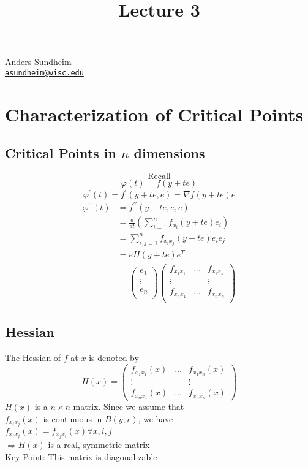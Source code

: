 \documentclass[12pt]{article}
\title{Lecture 3}
\newcommand{\doubleprime}{^{\prime\prime}}
\newcommand{\phii}{\varphi}
\begin{document}
\maketitle
\vspace*{-0.25in}
\begin{center}
	Anders Sundheim \\
	\href{mailto:asundheim@wisc.edu}{{\tt asundheim@wisc.edu}}
\end{center}
\section{Characterization of Critical Points}
\subsection{Critical Points in $n$ dimensions}
\[ \text{Recall} \]
\[ \phii(t) = f(y+te) \]
\[ \phii^\prime(t)=f^\prime(y+te,e)=\nabla f(y+te)e \]
\begin{align*}
  \phii\doubleprime(t) & = f\doubleprime(y+te,e,e) \\
   & =\frac{d}{dt}(\sum_{i=1}^{n}f_{x_i}(y+te)e_i) \\
   & = \sum_{i,j=1}^{n}f_{x_ix_j}(y+te)e_ie_j \\
   & = eH(y+te)e^T \\
   & =
   \begin{pmatrix}
    e_1 \\
    \vdots \\
    e_n \\
  \end{pmatrix}
  \begin{pmatrix}
   f_{x_1x_1} & \dots & f_{x_1x_n} \\
   \vdots & & \vdots \\
   f_{x_nx_1} & \dots & f_{x_nx_n} \\
  \end{pmatrix}
\end{align*}
\subsection{Hessian}
The Hessian of $f$ at $x$ is denoted by \\
\[
  H(x) = \begin{pmatrix}
  f_{x_1x_1}(x) & \dots & f_{x_1x_n}(x) \\
  \vdots & & \vdots \\
  f_{x_nx_1}(x) & \dots & f_{x_nx_n}(x)
  \end{pmatrix}
\]
$H(x)$ is a $n\times n$ matrix. Since we assume that \\
$f_{x_ix_j}(x)$ is continuous in $B(y,r)$, we have \\
$f_{x_ix_j}(x)=f_{x_jx_i}(x)\forall x,i,j$ \\
$\Rightarrow H(x)$ is a real, symmetric matrix \\
Key Point: This matrix is diagonalizable \\
\end{document}
